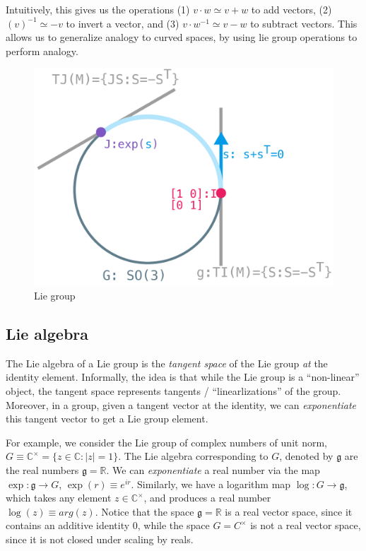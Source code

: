 \documentclass[11pt]{book}
\newcommand{\C}{\ensuremath{\mathbb{C}}}
\begin{document}
Intuitively, this gives us the operations (1) $v \cdot w \simeq v + w$ to add
vectors, (2)  $(v)^{-1} \simeq -v$ to invert a vector, and (3) $v \cdot w^{-1} \simeq v - w$
to subtract vectors. This allows us to generalize analogy to curved spaces, by using
lie group operations to perform analogy.

\begin{figure}[htb]
\includegraphics[width=\textwidth]{./lie-group.pdf}
\caption{Lie group}
\end{figure}


\subsection{Lie algebra}
The Lie algebra of a Lie group is the \emph{tangent space} of the Lie group
\emph{at} the identity element. Informally, the idea is that while the Lie group is a
``non-linear'' object, the tangent space represents tangents / ``linearlizations'' of the group.
Moreover, in a group, given a tangent vector at the identity, we can \emph{exponentiate} this
tangent vector to get a Lie group element.

For example, we consider the Lie group of complex numbers of unit norm,
$G \equiv \C^\times = \{ z \in \C : |z| = 1 \}$. The Lie algebra corresponding to $G$, denoted
by $\mathfrak g$ are the real numbers $\mathfrak g = \mathbb R$. We can \emph{exponentiate}
a real number via the map $\exp : \mathfrak g \rightarrow G$, $\exp(r) \equiv e^{i r}$. Similarly,
we have a logarithm map $\log: G \rightarrow \mathfrak g$, which takes any
element $z \in \C^\times$, and produces a real number $\log(z) \equiv arg(z)$.
Notice that the space $\mathfrak g = \mathbb R$ is a real vector space, since it contains an
additive identity $0$, while the space $G = C^\times$ is not a real vector space, since it
is not closed under scaling by reals.
\end{document}
